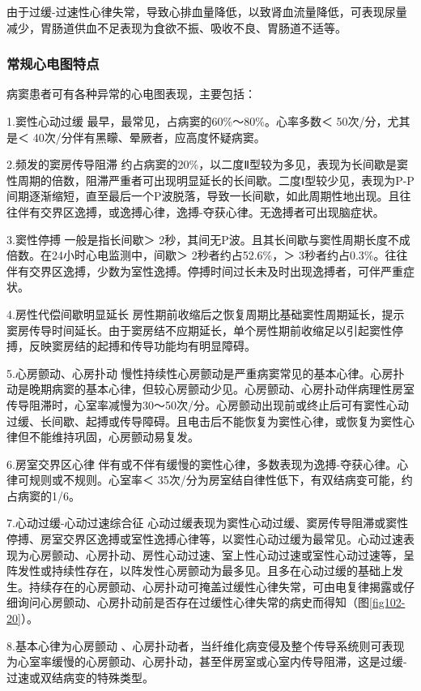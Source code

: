 由于过缓-过速性心律失常，导致心排血量降低，以致肾血流量降低，可表现尿量减少，胃肠道供血不足表现为食欲不振、吸收不良、胃肠道不适等。

\subsubsection{常规心电图特点}

病窦患者可有各种异常的心电图表现，主要包括：

1.窦性心动过缓 最早，最常见，占病窦的60\%～80\%。心率多数＜
50次/分，尤其是＜ 40次/分伴有黑矇、晕厥者，应高度怀疑病窦。

2.频发的窦房传导阻滞
约占病窦的20\%，以二度Ⅱ型较为多见，表现为长间歇是窦性周期的倍数，阻滞严重者可出现明显延长的长间歇。二度Ⅰ型较少见，表现为P-P间期逐渐缩短，直至最后一个P波脱落，导致一长间歇，如此周期性地出现。且往往伴有交界区逸搏，或逸搏心律，逸搏-夺获心律。无逸搏者可出现脑症状。

3.窦性停搏 一般是指长间歇＞
2秒，其间无P波。且其长间歇与窦性周期长度不成倍数。在24小时心电监测中，间歇＞
2秒者约占52.6\%，＞
3秒者约占0.3\%。往往伴有交界区逸搏，少数为室性逸搏。停搏时间过长未及时出现逸搏者，可伴严重症状。

4.房性代偿间歇明显延长
房性期前收缩后之恢复周期比基础窦性周期延长，提示窦房传导时间延长。由于窦房结不应期延长，单个房性期前收缩足以引起窦性停搏，反映窦房结的起搏和传导功能均有明显障碍。

5.心房颤动、心房扑动
慢性持续性心房颤动是严重病窦常见的基本心律。心房扑动是晚期病窦的基本心律，但较心房颤动少见。心房颤动、心房扑动伴病理性房室传导阻滞时，心室率减慢为30～50次/分。心房颤动出现前或终止后可有窦性心动过缓、长间歇、起搏或传导障碍。且电击后不能恢复为窦性心律，或恢复为窦性心律但不能维持巩固，心房颤动易复发。

6.房室交界区心律
伴有或不伴有缓慢的窦性心律，多数表现为逸搏-夺获心律。心律可规则或不规则。心室率＜
35次/分为房室结自律性低下，有双结病变可能，约占病窦的1/6。

7.心动过缓-心动过速综合征
心动过缓表现为窦性心动过缓、窦房传导阻滞或窦性停搏、房室交界区逸搏或室性逸搏心律等，以窦性心动过缓为最常见。心动过速表现为心房颤动、心房扑动、房性心动过速、室上性心动过速或室性心动过速等，呈阵发性或持续性存在，以阵发性心房颤动为最多见。且多在心动过缓的基础上发生。持续存在的心房颤动、心房扑动可掩盖过缓性心律失常，可由电复律揭露或仔细询问心房颤动、心房扑动前是否存在过缓性心律失常的病史而得知（图\ref{fig102-20}）。

8.基本心律为心房颤动
、心房扑动者，当纤维化病变侵及整个传导系统则可表现为心室率缓慢的心房颤动、心房扑动，甚至伴房室或心室内传导阻滞，这是过缓-过速或双结病变的特殊类型。

